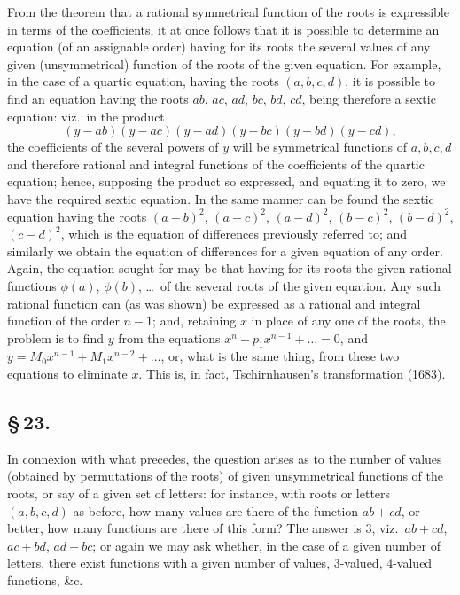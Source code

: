 \documentclass[11pt,a4paper]{book}
\begin{document}
From the theorem that a rational symmetrical function of the roots is expressible in terms of the coefficients, it at once follows that it is possible to determine an equation (of an assignable order) having for its roots the several values of any given (unsymmetrical) function of the roots of the given equation. For example, in the case of a quartic equation, having the roots $(a, b, c, d)$, it is possible to find an equation having the roots $ab$, $ac$, $ad$, $bc$, $bd$, $cd$, being therefore a sextic equation: viz.\ in the product
\[
(y - ab)(y - ac)(y - ad)(y - bc)(y - bd)(y - cd),
\]
the coefficients of the several powers of $y$ will be symmetrical functions of $a, b, c, d$ and therefore rational and integral functions of the coefficients of the quartic equation; hence, supposing the product so expressed, and equating it to zero, we have the required sextic equation. In the same manner can be found the sextic equation having the roots $(a - b)^{2}$, $(a - c)^{2}$, $(a - d)^{2}$, $(b - c)^{2}$, $(b - d)^{2}$, $(c - d)^{2}$, which is the equation of differences previously referred to; and similarly we obtain the equation of differences for a given equation of any order. Again, the equation sought for may be that having for its roots the given rational functions $\phi(a)$, $\phi(b)$, \ldots\ of the several roots of the given equation. Any such rational function can (as was shown) be expressed as a rational and integral function of the order $n - 1$; and, retaining $x$ in place of any one of the roots, the problem is to find $y$ from the equations $x^{n} - p_{1}x^{n-1} + \ldots = 0$, and $y = M_{0}x^{n-1} + M_{1}x^{n-2} + \ldots$, or, what is the same thing, from these two equations to eliminate $x$. This is, in fact, Tschirnhausen's transformation (1683).

\subsection*{\S\,23.}

In connexion with what precedes, the question arises as to the number of values (obtained by permutations of the roots) of given unsymmetrical functions of the roots, or say of a given set of letters: for instance, with roots or letters $(a, b, c, d)$ as before, how many values are there of the function $ab + cd$, or better, how many functions are there of this form? The answer is 3, viz.\ $ab + cd$, $ac + bd$, $ad + bc$; or again we may ask whether, in the case of a given number of letters, there exist functions with a given number of values, 3-valued, 4-valued functions, \&c.
\end{document}
